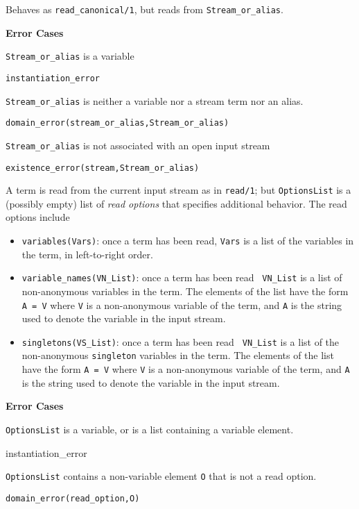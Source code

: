 \begin{description}

Behaves as {\tt read\_canonical/1}, but reads from {\tt Stream\_or\_alias}.

{\bf Error Cases}
\bi
\item 	{\tt Stream\_or\_alias} is a variable
\bi
\item {\tt instantiation\_error}
\ei
\item 	{\tt Stream\_or\_alias} is neither a variable nor a stream term nor an alias.
\bi
\item 	{\tt domain\_error(stream\_or\_alias,Stream\_or\_alias)}
\ei
\item 	{\tt Stream\_or\_alias} is not associated with an open input stream
\bi
\item 	{\tt existence\_error(stream,Stream\_or\_alias)}
\ei
\ei

%
A term is read from the current input stream as in {\tt read/1}; but
{\tt OptionsList} is a (possibly empty) list of {\em read options}
that specifies additional behavior.  The read options include
\begin{itemize}
\item {\tt variables(Vars)}: once a term has been read, {\tt Vars} is a
list of the variables in the term, in left-to-right order. 
\item {\tt variable\_names(VN\_List)}: once a term has been read {\tt
VN\_List} is a list of non-anonymous variables in the term.  The
elements of the list have the form {\tt A = V} where {\tt V} is a
non-anonymous variable of the term, and {\tt A} is the string used to
denote the variable in the input stream.
\item {\tt singletons(VS\_List)}: once a term has been read {\tt
VN\_List} is a list of the non-anonymous {\tt singleton} variables in
the term.  The elements of the list have the form {\tt A = V} where
{\tt V} is a non-anonymous variable of the term, and {\tt A} is the
string used to denote the variable in the input stream.
\end{itemize}

{\bf Error Cases}
\bi
\item 	{\tt OptionsList} is a variable, or is a list containing a
	variable element. 
\bi 
\item instantiation\_error
\ei
\item     {\tt OptionsList} contains a non-variable element {\tt O} that is not
	a read option.
\bi
\item 	{\tt domain\_error(read\_option,O)}
\ei
\ei


\end{description}

